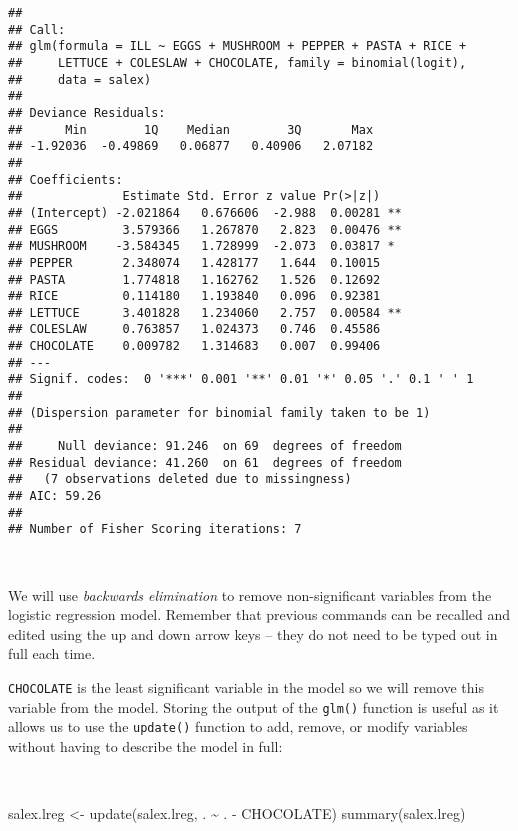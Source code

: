 \documentclass[
  12pt,
  a4paper]{book}
\newenvironment{Shaded}{\begin{snugshade}}{\end{snugshade}}
\newcommand{\FunctionTok}[1]{\textcolor[rgb]{0.00,0.00,0.00}{#1}}
\newcommand{\NormalTok}[1]{#1}
\newcommand{\OtherTok}[1]{\textcolor[rgb]{0.56,0.35,0.01}{#1}}
\newcommand{\SpecialCharTok}[1]{\textcolor[rgb]{0.00,0.00,0.00}{#1}}
\begin{document}
\begin{verbatim}
## 
## Call:
## glm(formula = ILL ~ EGGS + MUSHROOM + PEPPER + PASTA + RICE + 
##     LETTUCE + COLESLAW + CHOCOLATE, family = binomial(logit), 
##     data = salex)
## 
## Deviance Residuals: 
##      Min        1Q    Median        3Q       Max  
## -1.92036  -0.49869   0.06877   0.40906   2.07182  
## 
## Coefficients:
##              Estimate Std. Error z value Pr(>|z|)   
## (Intercept) -2.021864   0.676606  -2.988  0.00281 **
## EGGS         3.579366   1.267870   2.823  0.00476 **
## MUSHROOM    -3.584345   1.728999  -2.073  0.03817 * 
## PEPPER       2.348074   1.428177   1.644  0.10015   
## PASTA        1.774818   1.162762   1.526  0.12692   
## RICE         0.114180   1.193840   0.096  0.92381   
## LETTUCE      3.401828   1.234060   2.757  0.00584 **
## COLESLAW     0.763857   1.024373   0.746  0.45586   
## CHOCOLATE    0.009782   1.314683   0.007  0.99406   
## ---
## Signif. codes:  0 '***' 0.001 '**' 0.01 '*' 0.05 '.' 0.1 ' ' 1
## 
## (Dispersion parameter for binomial family taken to be 1)
## 
##     Null deviance: 91.246  on 69  degrees of freedom
## Residual deviance: 41.260  on 61  degrees of freedom
##   (7 observations deleted due to missingness)
## AIC: 59.26
## 
## Number of Fisher Scoring iterations: 7
\end{verbatim}

~

We will use \emph{backwards elimination} to remove non-significant variables from the logistic regression model. Remember that previous commands can be recalled and edited using the up and down arrow keys -- they do not need to be typed out in full each time.

\newpage

\texttt{CHOCOLATE} is the least significant variable in the model so we will remove this variable from the model. Storing the output of the \texttt{glm()} function is useful as it allows us to use the \texttt{update()} function to add, remove, or modify variables without having to describe the model in full:

~

\begin{Shaded}
\begin{Highlighting}[]
\NormalTok{salex.lreg }\OtherTok{\textless{}{-}} \FunctionTok{update}\NormalTok{(salex.lreg, . }\SpecialCharTok{\textasciitilde{}}\NormalTok{ . }\SpecialCharTok{{-}}\NormalTok{ CHOCOLATE)}
\FunctionTok{summary}\NormalTok{(salex.lreg)}
\end{Highlighting}
\end{Shaded}
\end{document}
